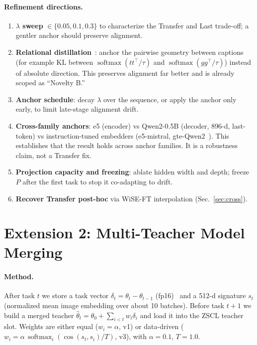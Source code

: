 \documentclass[11pt]{article}
\newcommand{\softmax}{\operatorname{softmax}}
\begin{document}
\paragraph{Refinement directions.}
\begin{enumerate}
  \item \textbf{$\lambda$ sweep} $\in\{0.05,0.1,0.3\}$ to characterize the Transfer and Last
        trade-off; a gentler anchor should preserve alignment.
  \item \textbf{Relational distillation}~\cite{rkd}: anchor the pairwise geometry between captions
        (for example $\mathrm{KL}$ between $\softmax(t t^\top/\tau)$ and $\softmax(g g^\top/\tau)$)
        instead of absolute direction. This preserves alignment far better and is already scoped as
        ``Novelty B.''
  \item \textbf{Anchor schedule}: decay $\lambda$ over the sequence, or apply the anchor only early,
        to limit late-stage alignment drift.
  \item \textbf{Cross-family anchors}: e5 (encoder) vs Qwen2-0.5B (decoder, 896-d, last-token) vs
        instruction-tuned embedders (e5-mistral, gte-Qwen2~\cite{gteqwen}). This establishes that the
        result holds across anchor families. It is a robustness claim, not a Transfer fix.
  \item \textbf{Projection capacity and freezing}: ablate hidden width and depth; freeze $P$ after the
        first task to stop it co-adapting to drift.
  \item \textbf{Recover Transfer post-hoc} via WiSE-FT interpolation (Sec.~\ref{sec:cross}).
\end{enumerate}

\section{Extension 2: Multi-Teacher Model Merging}

\paragraph{Method.} After task $t$ we store a task vector $\delta_t=\theta_t-\theta_{t-1}$
(fp16)~\cite{taskarith} and a 512-d signature $s_t$ (normalized mean image embedding over about 10
batches). Before task $t{+}1$ we build a merged teacher $\hat\theta_t=\theta_0+\sum_{i<t}w_i\delta_i$
and load it into the ZSCL teacher slot. Weights are either equal ($w_i=\alpha$, v1) or data-driven
($w_i=\alpha\,\softmax_i(\cos(s_t,s_i)/T)$, v3), with $\alpha=0.1$, $T=1.0$.
\end{document}

